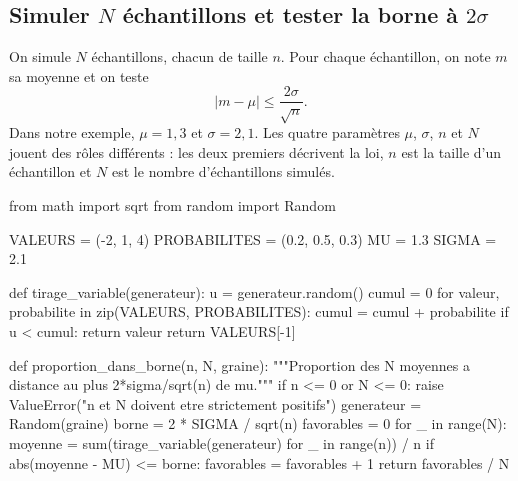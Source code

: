 \subsection{Simuler \texorpdfstring{$N$}{N} échantillons et tester la borne à \texorpdfstring{$2\sigma$}{2σ}}

On simule $N$ échantillons, chacun de taille $n$. Pour chaque échantillon,
on note $m$ sa moyenne et on teste
\[
  \lvert m-\mu\rvert\leq\frac{2\sigma}{\sqrt{n}}.
\]
Dans notre exemple, $\mu=1{,}3$ et $\sigma=2{,}1$. Les quatre paramètres
$\mu$, $\sigma$, $n$ et $N$ jouent des rôles différents : les deux premiers
décrivent la loi, $n$ est la taille d'un échantillon et $N$ est le nombre
d'échantillons simulés.

\begin{python}
from math import sqrt
from random import Random

VALEURS = (-2, 1, 4)
PROBABILITES = (0.2, 0.5, 0.3)
MU = 1.3
SIGMA = 2.1

def tirage_variable(generateur):
    u = generateur.random()
    cumul = 0
    for valeur, probabilite in zip(VALEURS, PROBABILITES):
        cumul = cumul + probabilite
        if u < cumul:
            return valeur
    return VALEURS[-1]

def proportion_dans_borne(n, N, graine):
    """Proportion des N moyennes a distance au plus 2*sigma/sqrt(n) de mu."""
    if n <= 0 or N <= 0:
        raise ValueError("n et N doivent etre strictement positifs")
    generateur = Random(graine)
    borne = 2 * SIGMA / sqrt(n)
    favorables = 0
    for _ in range(N):
        moyenne = sum(tirage_variable(generateur) for _ in range(n)) / n
        if abs(moyenne - MU) <= borne:
            favorables = favorables + 1
    return favorables / N
\end{python}



